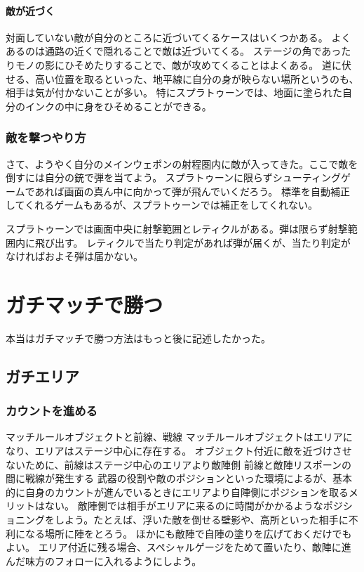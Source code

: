 \documentclass[a4paper,11pt]{jsbook}
\begin{document}
\subsubsection{敵が近づく}
対面していない敵が自分のところに近づいてくるケースはいくつかある。
よくあるのは通路の近くで隠れることで敵は近づいてくる。
ステージの角であったりモノの影にひそめたりすることで、敵が攻めてくることはよくある。
道に伏せる、高い位置を取るといった、地平線に自分の身が映らない場所というのも、相手は気が付かないことが多い。
特にスプラトゥーンでは、地面に塗られた自分のインクの中に身をひそめることができる。

\subsection{敵を撃つやり方}
さて、ようやく自分のメインウェポンの射程圏内に敵が入ってきた。ここで敵を倒すには自分の銃で弾を当てよう。
スプラトゥーンに限らずシューティングゲームであれば画面の真ん中に向かって弾が飛んでいくだろう。
標準を自動補正してくれるゲームもあるが、スプラトゥーンでは補正をしてくれない。

スプラトゥーンでは画面中央に射撃範囲とレティクルがある。弾は限らず射撃範囲内に飛び出す。
レティクルで当たり判定があれば弾が届くが、当たり判定がなければおよそ弾は届かない。

\chapter{ガチマッチで勝つ}
本当はガチマッチで勝つ方法はもっと後に記述したかった。
\section{ガチエリア}
\subsection{カウントを進める}
マッチルールオブジェクトと前線、戦線
マッチルールオブジェクトはエリアになり、エリアはステージ中心に存在する。
オブジェクト付近に敵を近づけさせないために、前線はステージ中心のエリアより敵陣側
前線と敵陣リスポーンの間に戦線が発生する
武器の役割や敵のポジションといった環境によるが、基本的に自身のカウントが進んでいるときにエリアより自陣側にポジションを取るメリットはない。
敵陣側では相手がエリアに来るのに時間がかかるようなポジショニングをしよう。たとえば、浮いた敵を倒せる壁影や、高所といった相手に不利になる場所に陣をとろう。
ほかにも敵陣で自陣の塗りを広げておくだけでもよい。
エリア付近に残る場合、スペシャルゲージをためて置いたり、敵陣に進んだ味方のフォローに入れるようにしよう。
\end{document}
